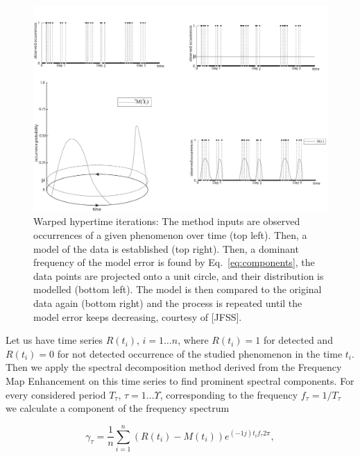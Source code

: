 \begin{figure}[!t]
\begin{center}
    \includegraphics[width=1.0\columnwidth]{fig/hypertime_graphs_a}
    \caption{Warped hypertime iterations: The method inputs are observed occurrences of a given phenomenon over time (top left). Then, a model of the data is established (top right). Then, a dominant frequency of the model error is found by Eq.~\ref{eq:components}, the data points are projected onto a unit circle, and their distribution is modelled (bottom left). The model is then compared to the original data again (bottom right) and the process is repeated until the model error keeps decreasing, courtesy of [JFSS].\label{fig:whyte}}

\end{center}
\end{figure}



Let us have time series $R\left(t_{i}\right)$, $i = 1 \ldots n$, where $R\left(t_{i}\right) = 1$ for detected and $R\left(t_{i}\right) = 0$ for not detected occurrence of the studied phenomenon in the time $t_{i}$.
Then we apply the spectral decomposition method derived from the Frequency Map Enhancement \cite{krajnik2017fremen} on this time series to find prominent spectral components.
For every considered period $T_{\tau}$, $\tau = 1 \ldots \Upsilon$, corresponding to the frequency ${f}_{\tau} = 1 / T_{\tau}$ we calculate a component of the frequency spectrum

\begin{equation}\label{eq:components}
\gamma_{\tau} = \frac{1}{n} \sum_{i = 1}^{n} (R\left(t_{i}\right)-M\left(t_{i}\right))e^{(-1j)t_{i}{f}_{\tau}2\pi},
\end{equation}


